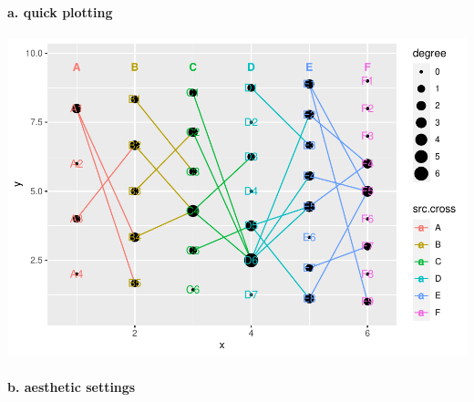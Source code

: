 \documentclass[
]{article}
\newenvironment{Shaded}{\begin{snugshade}}{\end{snugshade}}
\newcommand{\KeywordTok}[1]{\textcolor[rgb]{0.13,0.29,0.53}{\textbf{#1}}}
\newcommand{\NormalTok}[1]{#1}
\newcommand{\OperatorTok}[1]{\textcolor[rgb]{0.81,0.36,0.00}{\textbf{#1}}}
\newcommand{\StringTok}[1]{\textcolor[rgb]{0.31,0.60,0.02}{#1}}
\let\oldparagraph\paragraph
\renewcommand{\paragraph}[1]{\oldparagraph{#1}\mbox{}}
\begin{document}
\hypertarget{a.-quick-plotting}{%
\paragraph{a. quick plotting}\label{a.-quick-plotting}}

\begin{Shaded}
\end{Shaded}

\includegraphics{ReadMe_files/figure-latex/unnamed-chunk-8-1.pdf}

\hypertarget{b.-aesthetic-settings}{%
\paragraph{b. aesthetic settings}\label{b.-aesthetic-settings}}
\end{document}
